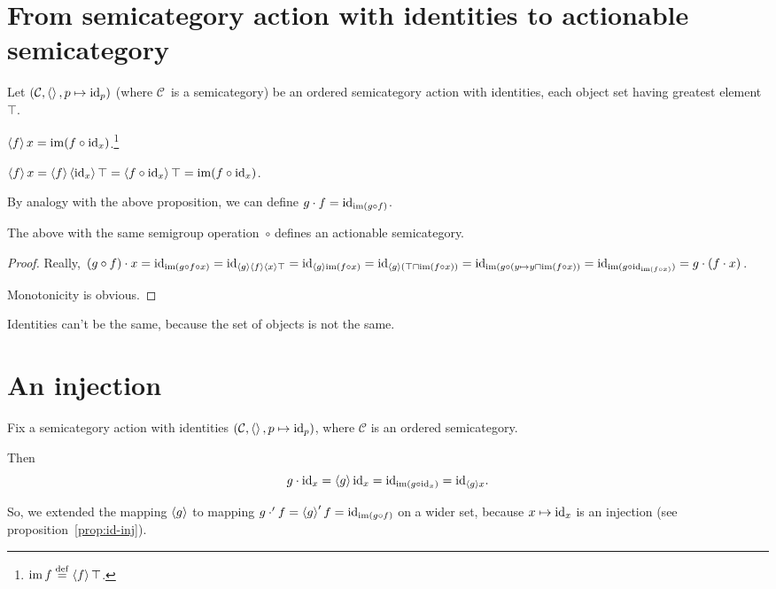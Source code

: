 \documentclass[a4paper,oneside,english,reqno]{amsart}
\begin{document}
\section{From semicategory action with identities to actionable semicategory}

Let $(\mathcal{C},\supfun{},p\mapsto\id_p)$ (where $\mathcal{C}$~is a semicategory) be an ordered semicategory action with identities, each object set having greatest element~$\top$.

\begin{prop}
$\supfun{f}x = \im(f\circ\id_x)$.\footnote{$\im f \eqdef \supfun{f}\top$.}
\end{prop}

\begin{prop}
$\supfun{f}x = \supfun{f}\supfun{\id_x}\top = \supfun{f\circ\id_x}\top = \im(f\circ\id_x)$.
\end{prop}

By analogy with the above proposition, we can define $g\cdot f = \id_{\im(g\circ f)}$.

\begin{prop}
The above with the same semigroup operation~$\circ$ defines an actionable semicategory.
\end{prop}

\begin{proof}
Really, $(g\circ f)\cdot x = \id_{\im(g\circ f\circ x)} = \id_{\supfun{g}\supfun{f}\supfun{x}\top} = \id_{\supfun{g}{\im(f\circ x)}} = \id_{\supfun{g}(\top\sqcap\im(f\circ x))} = \id_{\im(g\circ(y\mapsto y\sqcap\im(f\circ x))} = \id_{\im(g\circ\id_{\im(f\circ x)})} = g\cdot(f\cdot x)$.

Monotonicity is obvious.
\end{proof}

\begin{rem}
Identities can't be the same, because the set of objects is not the same.
\end{rem}

\section{An injection}

Fix a semicategory action with identities $(\mathcal{C},\supfun{},p\mapsto\id_p)$, where $\mathcal{C}$ is an ordered semicategory.

Then \[ g\cdot\id_x = \supfun{g}\id_x = \id_{\im(g\circ\id_x)} = \id_{\supfun{g}x}. \]

So, we extended the mapping $\supfun{g}$ to mapping $g\cdot'f=\supfun{g}'f=\id_{\im(g\circ f)}$ on a wider set, because $x\mapsto\id_x$ is an injection (see proposition~\ref{prop:id-inj}).
\end{document}

